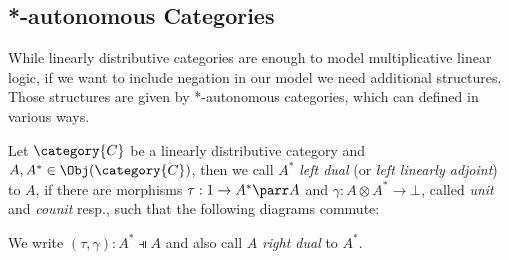 \documentclass[DIN, pagenumber=false, fontsize=11pt, parskip=half, colorinlistoftodos, svgnames]{scrartcl}
\newcommand{\formatnote}[2][]{\todo[color=cyan!40, #1]{#2}}
\begin{document}
	\subsection{*-autonomous Categories}
	\label{subsec: autoCats}
	
	While linearly distributive categories are enough to  model multiplicative linear logic, if we want to include negation in our model we need additional structures. Those structures are given by *-autonomous categories, which can defined in various ways.
	
	\begin{definition}
		\label{def: dualObj}
		Let $\category{C} $ be a linearly distributive category and $A, A^* \in \Obj(\category{C}) $, then we call $A^* $ \emph{left dual} (or \emph{left linearly adjoint}) to $A$, if there are morphisms $\tau: 1 \rightarrow A^* \parr A$ and $\gamma: A \otimes A^* \rightarrow \bot $, called \emph{unit} and \emph{counit} resp., such that the following diagrams commute:
		\begin{center}
		\end{center}
		
		We write $(\tau, \gamma): A^* \dashV A $ and also call $A$ \emph{right dual} to $A^*$. 
		
	\end{definition}
	
\end{document}
